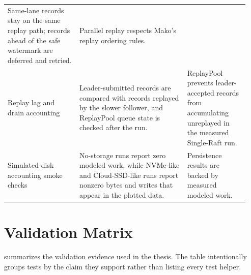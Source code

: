 \begin{longtable}{@{}>{\raggedright\arraybackslash}p{0.28\linewidth}
>{\raggedright\arraybackslash}p{0.42\linewidth}
>{\raggedright\arraybackslash}p{0.24\linewidth}@{}}
Same-lane records stay on the same replay path; records ahead of the safe watermark are deferred and retried. &
Parallel replay respects Mako's replay ordering rules. \\
\addlinespace
Replay lag and drain accounting &
Leader-submitted records are compared with records replayed by the slower follower, and ReplayPool queue state is checked after the run. &
ReplayPool prevents leader-accepted records from accumulating unreplayed in the measured Single-Raft run. \\
\addlinespace
Simulated-disk accounting smoke checks &
No-storage runs report zero modeled work, while NVMe-like and Cloud-SSD-like runs report nonzero bytes and writes that appear in the plotted data. &
Persistence results are backed by measured modeled work. \\
\bottomrule
\end{longtable}
\endgroup

\section{Validation Matrix}

 summarizes the validation evidence used in the
thesis. The table intentionally groups tests by the claim they support rather
than listing every test helper.

